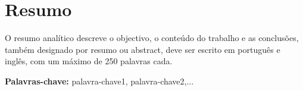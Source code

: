 \section*{Resumo}


O resumo analítico descreve o objectivo, o conteúdo do trabalho e as conclusões, também designado por resumo ou abstract, deve ser escrito em português e inglês, com um máximo de 250 palavras cada.

\vfill

\textbf{\Large Palavras-chave:} palavra-chave1, palavra-chave2,...

\cleardoublepage

